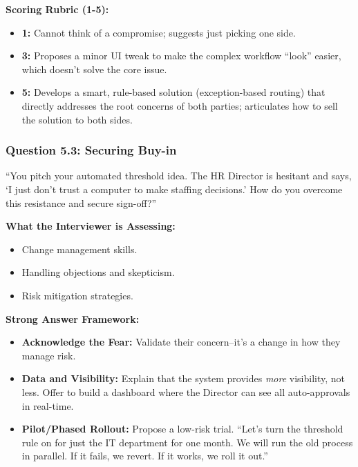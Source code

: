 \documentclass[
  11pt,
  openany,
  oneside]{book}
\providecommand{\tightlist}{%
  \setlength{\itemsep}{0pt}\setlength{\parskip}{0pt}}
\begin{document}
\textbf{Scoring Rubric (1-5):}

\begin{itemize}
\tightlist
\item
  \textbf{1:} Cannot think of a compromise; suggests just picking one
  side.
\item
  \textbf{3:} Proposes a minor UI tweak to make the complex workflow
  ``look'' easier, which doesn't solve the core issue.
\item
  \textbf{5:} Develops a smart, rule-based solution (exception-based
  routing) that directly addresses the root concerns of both parties;
  articulates how to sell the solution to both sides.
\end{itemize}

\subsubsection{Question 5.3: Securing
Buy-in}\label{question-5.3-securing-buy-in}

``You pitch your automated threshold idea. The HR Director is hesitant
and says, `I just don't trust a computer to make staffing decisions.'
How do you overcome this resistance and secure sign-off?''

\textbf{What the Interviewer is Assessing:}

\begin{itemize}
\tightlist
\item
  Change management skills.
\item
  Handling objections and skepticism.
\item
  Risk mitigation strategies.
\end{itemize}

\textbf{Strong Answer Framework:}

\begin{itemize}
\tightlist
\item
  \textbf{Acknowledge the Fear:} Validate their concern--it's a change
  in how they manage risk.
\item
  \textbf{Data and Visibility:} Explain that the system provides
  \emph{more} visibility, not less. Offer to build a dashboard where the
  Director can see all auto-approvals in real-time.
\item
  \textbf{Pilot/Phased Rollout:} Propose a low-risk trial. ``Let's turn
  the threshold rule on for just the IT department for one month. We
  will run the old process in parallel. If it fails, we revert. If it
  works, we roll it out.''
\end{itemize}
\end{document}
